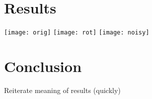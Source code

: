\documentclass[conference,compsoc]{IEEEtran}
\begin{document}
\section{Results}

\texttt{[image: orig]}
\texttt{[image: rot]}
\texttt{[image: noisy]}
\section{Conclusion}
%
Reiterate meaning of results (quickly)

\nocite{*}

%





  



\end{document}
